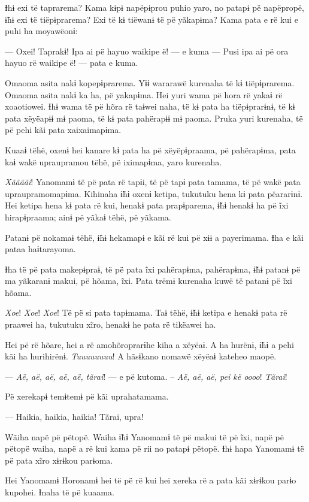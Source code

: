 Ɨhɨ exi të taprarema? Kama kɨpɨ napëpɨprou puhio yaro, no patapɨ pë
napëpropë, ɨ̃hɨ exi të tiëpɨprarema? Exi të kɨ tiëwanɨ të pë yãkapɨma?
Kama pata e rë kui e puhi ha moyawëonɨ: 

--- Oxei! Taprakɨ! Ipa ai pë hayuo waikipe ë! --- e kuma --- Pusi ipa ai pë
ora hayuo rë waikipe ë! --- pata e kuma. 

Omaoma asita nakɨ kopepɨprarema. Yɨɨ wararawë kurenaha të kɨ
tiëpɨprarema. Omaoma asita nakɨ ka ha, pë yakapɨma. Hei yuri wama pë
hora rë yakaɨ rë xoaotiowei. Ɨhɨ wama të pë hõra rë taɨwei naha, të kɨ
pata ha tiëpɨprarɨnɨ, të kɨ pata xëyëapɨɨ mɨ paoma, të kɨ pata pahërapɨɨ
mɨ paoma. Pruka yuri kurenaha, të pë pehi kãi pata xaixaimapɨma. 

Kuaaɨ tëhë, oxenɨ hei kanare kɨ pata ha pë xëyëpɨpraama, pë pahërapɨma,
pata kaɨ wakë upraupramou tëhë, pë iximapɨma, yaro kurenaha. 

\textit{Xããããi}! Yanomamɨ të pë pata rë tapɨi, të pë tapɨ pata tamama, të pë wakë
pata upraupramomapɨma. Kihinaha ɨ̃hɨ oxenɨ ketipa, tukutuku hena kɨ pata
pëararɨnɨ. Hei ketipa hena kɨ pata rë kui, henakɨ pata prapɨparema, ɨ̃hɨ
henakɨ ha pë ĩxi hirapɨpraama; ainɨ pë yãkaɨ tëhë, pë yãkama. 

Patanɨ pë nokamaɨ tëhë, ɨ̃hɨ hekamapɨ e kãi rë kui pë xɨɨ a payerimama.
Ɨha e kãi pataa haɨtarayoma. 

Ɨha të pë pata makepɨpraɨ, të pë pata ĩxi pahërapɨma, pahërapɨma, ɨ̃hɨ
patanɨ pë ma yãkaranɨ makui, pë hõama, ĩxi. Pata trëmɨ kurenaha kuwë të
patanɨ pë ĩxi hõama. 

\textit{Xoe}! \textit{Xoe}! \textit{Xoe}! Të pë si pata tapɨmama. Taɨ tëhë, ɨ̃hɨ ketipa e henakɨ
pata rë praawei ha, tukutuku xĩro, henakɨ he pata rë tikëawei ha. 

Hei pë rë hõare, hei a rë amohõroprarɨhe kiha a xëyëaɨ. A ha hurënɨ, ɨ̃hɨ
a pehi kãi ha hurihirënɨ. \textit{Tuuuuuuuu}! A hãsɨkano nomawë xëyëaɨ kateheo
maopë. 

--- \textit{Aë, aë, aë, aë, aë, tãrai}! --- e pë kutoma. -- \textit{Aë, aë, aë, pei kë oooo}!
\textit{Tãrai}!

Pë xerekapɨ temɨtemɨ pë kãi uprahatamama. 

--- Haikia, haikia, haikia! Tãrai, upra! 

Wãiha napë pë pëtopë. Waiha ɨ̃hɨ Yanomamɨ të pë makui të pë ĩxi, napë pë
pëtopë waiha, napë a rë kui kama pë rii no patapɨ pëtopë. Ɨhɨ hapa
Yanomamɨ të pë pata xĩro xɨrɨkou parɨoma. 

Hei Yanomamɨ Horonamɨ hei të pë rë kui hei xereka rë a pata kãi xɨrɨkou
parɨo kupohei. Ɨnaha të pë kuaama. 

